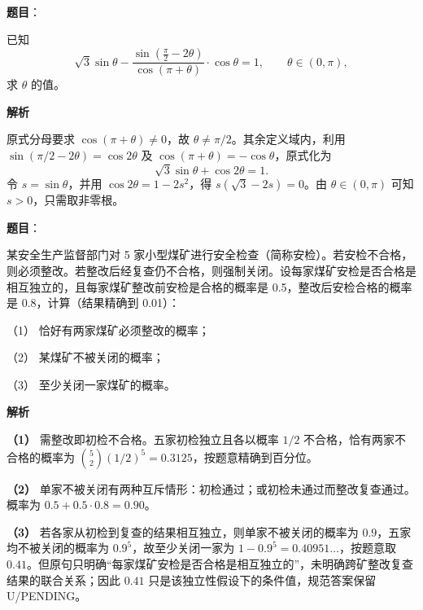 \begin{answer}

\textbf{题目}：

已知
\nopagebreak[4]
\[
\sqrt3\sin\theta-\frac{\sin\left(\frac{\pi}{2}-2\theta\right)}{\cos(\pi+\theta)}\cdot\cos\theta=1,\qquad \theta\in(0,\pi),
\]
求 $\theta$ 的值。

\textbf{解析}

原式分母要求 $\cos(\pi+\theta)\ne0$，故 $\theta\ne\pi/2$。其余定义域内，利用 $\sin(\pi/2-2\theta)=\cos2\theta$ 及 $\cos(\pi+\theta)=-\cos\theta$，原式化为
\nopagebreak[4]
\[
\sqrt3\sin\theta+\cos2\theta=1.
\]
令 $s=\sin\theta$，并用 $\cos2\theta=1-2s^2$，得 $s(\sqrt3-2s)=0$。由 $\theta\in(0,\pi)$ 可知 $s>0$，只需取非零根。


\end{answer}
\begin{answer}

\textbf{题目}：

某安全生产监督部门对 5 家小型煤矿进行安全检查（简称安检）。若安检不合格，则必须整改。若整改后经复查仍不合格，则强制关闭。设每家煤矿安检是否合格是相互独立的，且每家煤矿整改前安检是合格的概率是 0.5，整改后安检合格的概率是 0.8，计算（结果精确到 0.01）：

（1） 恰好有两家煤矿必须整改的概率；

（2） 某煤矿不被关闭的概率；

（3） 至少关闭一家煤矿的概率。

\textbf{解析}

\textbf{（1）} 需整改即初检不合格。五家初检独立且各以概率 $1/2$ 不合格，恰有两家不合格的概率为 $\binom52(1/2)^5=0.3125$，按题意精确到百分位。

\textbf{（2）} 单家不被关闭有两种互斥情形：初检通过；或初检未通过而整改复查通过。概率为 $0.5+0.5\cdot0.8=0.90$。

\textbf{（3）} 若各家从初检到复查的结果相互独立，则单家不被关闭的概率为 $0.9$，五家均不被关闭的概率为 $0.9^5$，故至少关闭一家为 $1-0.9^5=0.40951\ldots$，按题意取 $0.41$。但原句只明确“每家煤矿安检是否合格是相互独立的”，未明确跨矿整改复查结果的联合关系；因此 $0.41$ 只是该独立性假设下的条件值，规范答案保留 U/PENDING。




\end{answer}

